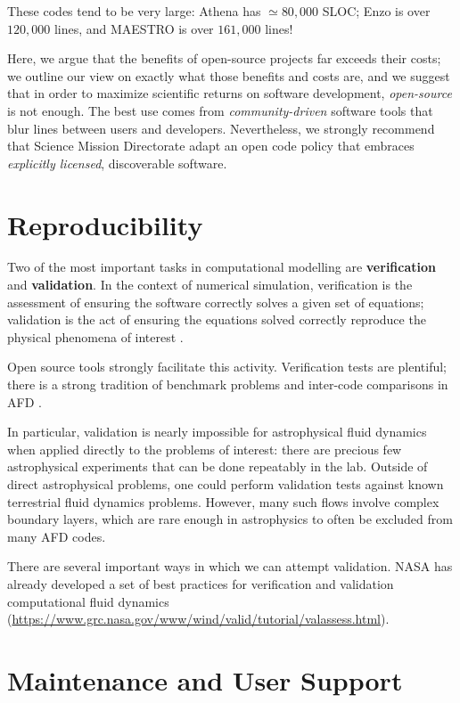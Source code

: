 \documentclass[12pt, preprint]{aastex}
\begin{document}
These codes tend to be very large: Athena has $\simeq 80,000$ SLOC; Enzo is over $120,000$ lines, and MAESTRO is over $161,000$ lines! 

Here, we argue that the benefits of open-source projects far exceeds their costs; we outline our view on exactly what those benefits and costs are, and we suggest that in order to maximize scientific returns on software development, \emph{open-source} is not enough. The best use comes from \emph{community-driven} software tools that blur lines between users and developers. Nevertheless, we strongly recommend that Science Mission Directorate adapt an open code policy that embraces \emph{explicitly licensed}, discoverable software. 

\section{Reproducibility}
\label{sec:repro}

Two of the most important tasks in computational modelling are \textbf{verification} and \textbf{validation}. In the context of numerical simulation, verification is the assessment of ensuring the software correctly solves a given set of equations; validation is the act of ensuring the equations solved correctly reproduce the physical phenomena of interest \citep{2002PrAeS..38..209O}. 

Open source tools strongly facilitate this activity. Verification tests are plentiful; there is a strong tradition of benchmark problems and inter-code comparisons in AFD \citep[e.g.][among many others]{2001JGR...106.3715B,2014GeoJI.197..119M,2014ApJS..210...14K,2016MNRAS.455.4274L}.

In particular, validation is nearly impossible for astrophysical fluid dynamics when applied directly to the problems of interest: there are precious few astrophysical experiments that can be done repeatably in the lab. Outside of direct astrophysical problems, one could perform validation tests against known terrestrial fluid dynamics problems.  However, many such flows involve complex boundary layers, which are rare enough in astrophysics to often be excluded from many AFD codes. 

There are several important ways in which we can attempt validation. NASA has already developed a set of best practices for verification and validation computational fluid dynamics (\url{https://www.grc.nasa.gov/www/wind/valid/tutorial/valassess.html}). 

\section{Maintenance and User Support}
\label{sec:support}
\end{document}
